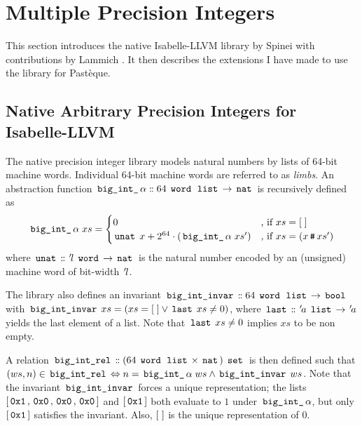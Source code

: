 \section{Multiple Precision Integers}\label{sec:multiple-precision-integers}

This section introduces the native Isabelle-LLVM library by Spinei with contributions by Lammich \cite{spinei_isabelle_big_integer}.
It then describes the extensions I have made to use the library for Pastèque.

\subsection{Native Arbitrary Precision Integers for Isabelle-LLVM}\label{sec:native-arbitrary-precision-integers-for-isabelle-llvm}

The native precision integer library models natural numbers by lists of 64-bit machine words.
Individual 64-bit machine words are referred to as \textit{limbs}.
An abstraction function $\,\text{\ttfamily big\_int\_}\,\alpha \mathrel{\mathord{:}\mkern-1.2mu\mathord{:}} 64 \; \,\text{\ttfamily word}\, \; \,\text{\ttfamily list}\, \rightarrow \,\text{\ttfamily nat}\,$ is recursively defined as
\begin{gather*}
	\,\text{\ttfamily big\_int\_}\,\alpha \; xs =
	\begin{cases}
		0                                                                    & \text{, if $xs=[ \; ]$}            \\
		\,\text{\ttfamily unat}\, \; x + 2^{64} \cdot (\,\text{\ttfamily big\_int\_}\,\alpha \; xs') & \text{, if $xs = (x \,\text{\ttfamily \#}\, xs')$}
	\end{cases}
\end{gather*}
where $\,\text{\ttfamily unat}\, \mathrel{\mathord{:}\mkern-1.2mu\mathord{:}} {\mskip2mu '\mskip-2mul} \; \,\text{\ttfamily word}\, \rightarrow \,\text{\ttfamily nat}\,$ is the natural number encoded by an (unsigned) machine word of bit-width ${\mskip2mu '\mskip-2mul}$.

The library also defines an invariant $\,\text{\ttfamily big\_int\_invar}\, \mathrel{\mathord{:}\mkern-1.2mu\mathord{:}} 64 \; \,\text{\ttfamily word}\, \; \,\text{\ttfamily list}\, \rightarrow \,\text{\ttfamily bool}\,$ with $\,\text{\ttfamily big\_int\_invar}\, \; xs = (xs = [ \; ] \lor \,\text{\ttfamily last}\, \; xs \neq 0)$, where $\,\text{\ttfamily last}\, \mathrel{\mathord{:}\mkern-1.2mu\mathord{:}} {\mskip2mu '\mskip-2mua} \; \,\text{\ttfamily list}\, \rightarrow {\mskip2mu '\mskip-2mua}$ yields the last element of a list.
Note that $\,\text{\ttfamily last}\, \; xs \neq 0$ implies $xs$ to be non empty.

A relation $\,\text{\ttfamily big\_int\_rel}\, \mathrel{\mathord{:}\mkern-1.2mu\mathord{:}} (64 \; \,\text{\ttfamily word}\, \; \,\text{\ttfamily list}\, \times \,\text{\ttfamily nat}\,) \; \,\text{\ttfamily set}\,$ is then defined such that $(ws,n) \in \,\text{\ttfamily big\_int\_rel}\, \Leftrightarrow n = \,\text{\ttfamily big\_int\_}\,\alpha \; ws \land \,\text{\ttfamily big\_int\_invar}\, \; ws$.
Note that the invariant $\,\text{\ttfamily big\_int\_invar}\,$ forces a unique representation; the lists $[\,\text{\ttfamily 0x1}\,,\,\text{\ttfamily 0x0}\,,\,\text{\ttfamily 0x0}\,,\,\text{\ttfamily 0x0}\,]$ and $[\,\text{\ttfamily 0x1}\,]$ both evaluate to $1$ under $\,\text{\ttfamily big\_int\_}\,\alpha$, but only $[\,\text{\ttfamily 0x1}\,]$ satisfies the invariant.
Also, $[ \; ]$ is the unique representation of $0$.

